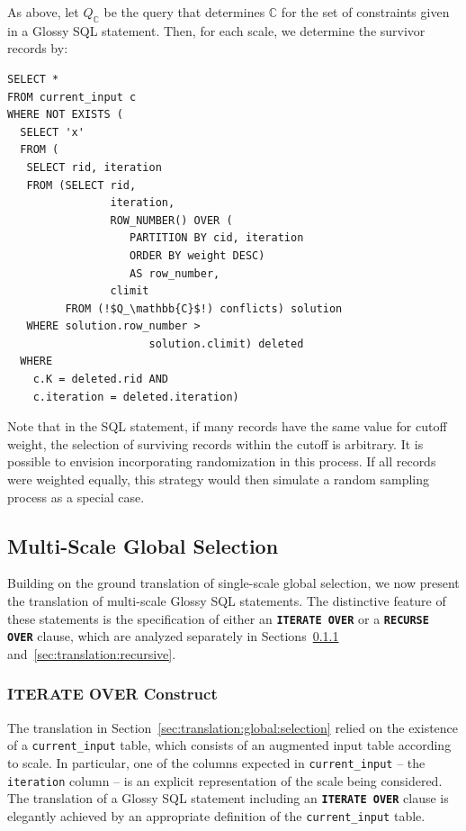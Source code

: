 \documentclass[11pt, oneside]{report}
\begin{document}
{As above, let $Q_\mathbb{C}$ be the query that determines $\mathbb{C}$ for the set of constraints given in a Glossy SQL statement. Then, for each scale, we determine the survivor records by: 

\begin{lstlisting}[escapechar=!]
SELECT *
FROM current_input c
WHERE NOT EXISTS (
  SELECT 'x'
  FROM (
   SELECT rid, iteration
   FROM (SELECT rid,
                iteration, 
                ROW_NUMBER() OVER (
                   PARTITION BY cid, iteration 
                   ORDER BY weight DESC) 
                   AS row_number, 
                climit
         FROM (!$Q_\mathbb{C}$!) conflicts) solution
   WHERE solution.row_number >
                      solution.climit) deleted
  WHERE 
    c.K = deleted.rid AND
    c.iteration = deleted.iteration)
\end{lstlisting}

Note that in the SQL statement, if many records have the same value for cutoff weight, the selection of surviving records within the cutoff is arbitrary. It is possible to envision incorporating randomization in this process. If all records were weighted equally, this strategy would then simulate a random sampling process as a special case. 

\subsection{Multi-Scale Global Selection}
\label{sec:translation:multiscale}

Building on the ground translation of single-scale global selection, we now present the translation of multi-scale Glossy SQL statements. The distinctive feature of these statements is the specification of either an \textbf{\texttt{ITERATE OVER}} or a \textbf{\texttt{RECURSE OVER}} clause, which are analyzed separately in Sections~\ref{sec:translation:iterative} and~\ref{sec:translation:recursive}.   

\subsubsection{ITERATE OVER Construct}
\label{sec:translation:iterative}

The translation in Section~\ref{sec:translation:global:selection} relied on the existence of a \texttt{current\_input} table, which consists of an augmented input table according to scale. In particular, one of the columns expected in \texttt{current\_input} -- the \texttt{iteration} column -- is an explicit representation of the scale being considered. The translation of a Glossy SQL statement including an \textbf{\texttt{ITERATE OVER}} clause is elegantly achieved by an appropriate definition of the \texttt{current\_input} table.

}
\end{document}
